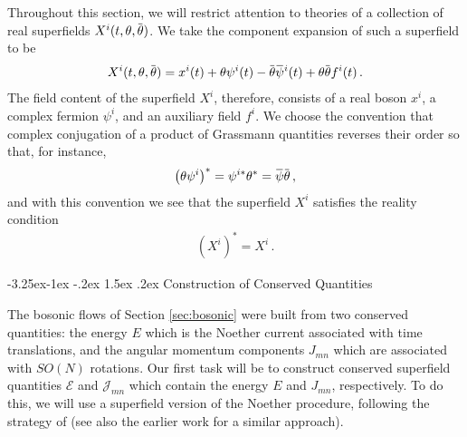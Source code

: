\documentclass[12pt]{article}
\makeatletter
\numberwithin{equation}{section}
\renewcommand\subsection{\@startsection{subsection}{2}{\z@}%
                                     {-3.25ex\@plus -1ex \@minus -.2ex}%
                                     {1.5ex \@plus .2ex}%
                                     {\normalfont\bfseries}}
\newcommand{\overbar}[1]{\mkern 1.5mu\overline{\mkern-1.5mu#1\mkern-1.5mu}\mkern 1.5mu}
\newcommand{\psib}{\overbar{\psi}}
\newcommand{\thetab}{\overbar{\theta}}
\makeatother
\begin{document}
%
Throughout this section, we will restrict attention to theories of a collection of real superfields $X^i ( t , \theta , \thetab )$. We take the component expansion of such a superfield to be
%
\begin{align}
    X^i ( t, \theta , \thetab ) = x^i ( t ) + \theta \psi^i ( t ) - \thetab \psib^i ( t ) + \theta \thetab f^i ( t ) \, .
\end{align}
%
The field content of the superfield $X^i$, therefore, consists of a real boson $x^i$, a complex fermion $\psi^i$, and an auxiliary field $f^i$. We choose the convention that complex conjugation of a product of Grassmann quantities reverses their order so that, for instance,
%
\begin{align}
    \left( \theta \psi^i \right)^\ast = \psi^{i \ast} \theta^\ast = \psib \thetab \, , 
\end{align}
%
and with this convention we see that the superfield $X^i$ satisfies the reality condition
%
\begin{align}
    \left( X^i \right)^\ast = X^i \, .
\end{align}


\subsection{Construction of Conserved Quantities}

The bosonic flows of Section \ref{sec:bosonic} were built from two conserved quantities: the energy $E$ which is the Noether current associated with time translations, and the angular momentum components $J_{mn}$ which are associated with $SO(N)$ rotations. Our first task will be to construct conserved superfield quantities $\mathcal{E}$ and $\mathcal{J}_{mn}$ which contain the energy $E$ and $J_{mn}$, respectively. To do this, we will use a superfield version of the Noether procedure, following the strategy of \cite{Ebert:2022xfh} (see also the earlier work \cite{Clark:2001zv} for a similar approach).
\end{document}
